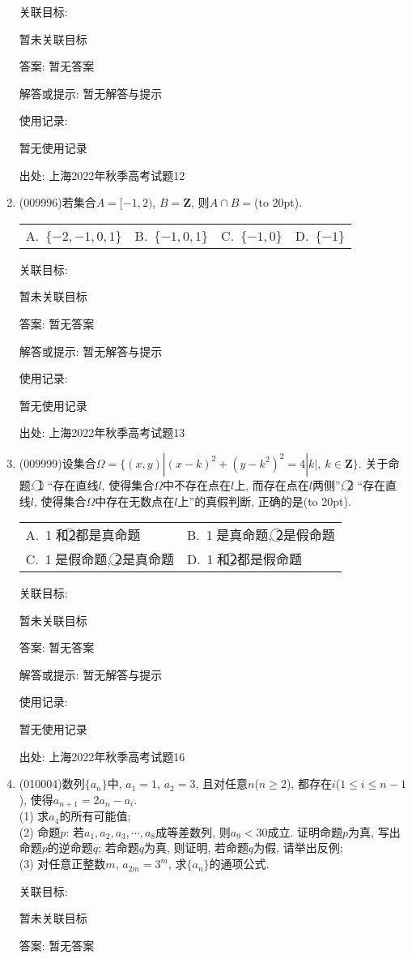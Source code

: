 \documentclass[10pt,a4paper]{article}
\newcommand{\bracket}[1]{(\hbox to #1pt{})}
\newcommand{\twoch}[4]{\par\begin{tabular}{p{.46\textwidth}p{.46\textwidth}}
A.~#1& B.~#2\\
C.~#3& D.~#4
\end{tabular}}
\newcommand{\fourch}[4]{\par\begin{tabular}{p{.23\textwidth}p{.23\textwidth}p{.23\textwidth}p{.23\textwidth}}
A.~#1 &B.~#2& C.~#3& D.~#4
\end{tabular}}
\begin{document}
\begin{enumerate}[1.]
关联目标:

暂未关联目标

答案: 暂无答案

解答或提示: 暂无解答与提示

使用记录:

暂无使用记录


出处: 上海2022年秋季高考试题12
\item { (009996)}若集合$A=[-1,2)$, $B=\mathbf{Z}$, 则$A\cap B=$\bracket{20}.
\fourch{$\{-2,-1,0,1\}$}{$\{-1,0,1\}$}{$\{-1,0\}$}{$\{-1\}$}


关联目标:

暂未关联目标

答案: 暂无答案

解答或提示: 暂无解答与提示

使用记录:

暂无使用记录


出处: 上海2022年秋季高考试题13
\item { (009999)}设集合$\Omega = \{(x,y)|(x-k)^2+(y-k^2)^2=4|k|, \ k\in \mathbf{Z}\}$. 关于命题:
\textcircled{1} ``存在直线$l$, 使得集合$\Omega$中不存在点在$l$上, 而存在点在$l$两侧''; \textcircled{2} ``存在直线$l$, 使得集合$\Omega$中存在无数点在$l$上''的真假判断, 正确的是\bracket{20}.
\twoch{\textcircled{1}和\textcircled{2}都是真命题}{\textcircled{1}是真命题, \textcircled{2}是假命题}{\textcircled{1}是假命题, \textcircled{2}是真命题}{\textcircled{1}和\textcircled{2}都是假命题}


关联目标:

暂未关联目标

答案: 暂无答案

解答或提示: 暂无解答与提示

使用记录:

暂无使用记录


出处: 上海2022年秋季高考试题16
\item { (010004)}数列$\{a_n\}$中, $a_1=1$, $a_2=3$, 且对任意$n$($n\ge 2$), 都存在$i$($1\le i\le n-1$), 使得$a_{n+1}=2a_n-a_i$.\\
(1) 求$a_4$的所有可能值;\\
(2) 命题$p$: 若$a_1,a_2,a_3,\cdots,a_8$成等差数列, 则$a_9<30$成立. 证明命题$p$为真, 写出命题$p$的逆命题$q$; 若命题$q$为真, 则证明, 若命题$q$为假, 请举出反例;\\
(3) 对任意正整数$m$, $a_{2m}=3^m$, 求$\{a_n\}$的通项公式.


关联目标:

暂未关联目标

答案: 暂无答案


\end{enumerate}
\end{document}
